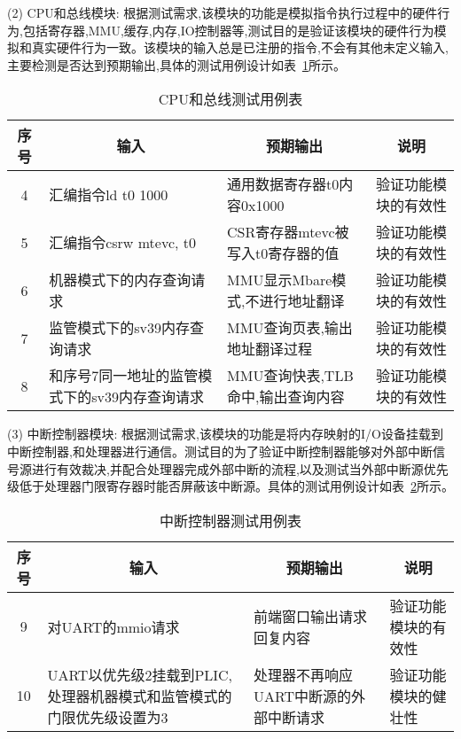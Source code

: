 (2) CPU和总线模块: 根据测试需求,该模块的功能是模拟指令执行过程中的硬件行为,包括寄存器,MMU,缓存,内存,IO控制器等,测试目的是验证该模块的硬件行为模拟和真实硬件行为一致。该模块的输入总是已注册的指令,不会有其他未定义输入,主要检测是否达到预期输出,具体的测试用例设计如表~\ref{tab:test2}所示。
\begin{table}[h]
    \centering
    \caption{CPU和总线测试用例表}
    \label{tab:test2}
    \renewcommand\arraystretch{1.2}
    \begin{tabular}{clll}
      \toprule
      \multicolumn{1}{c}{序号} & \multicolumn{1}{c}{输入} & \multicolumn{1}{c}{预期输出} &\multicolumn{1}{c}{说明}\\
      \midrule
  4	& \multicolumn{1}{m{3.5cm}}{汇编指令ld t0 1000} & \multicolumn{1}{m{3.5cm}}{通用数据寄存器t0内容0x1000} & \multicolumn{1}{m{3.5cm}}{验证功能模块的有效性}\\
  \hline
  5	& \multicolumn{1}{m{3.5cm}}{汇编指令csrw mtevc, t0} & \multicolumn{1}{m{3.5cm}}{CSR寄存器mtevc被写入t0寄存器的值} & \multicolumn{1}{m{3.5cm}}{验证功能模块的有效性}\\
  \hline
  6	& \multicolumn{1}{m{3.5cm}}{机器模式下的内存查询请求} & \multicolumn{1}{m{3.5cm}}{MMU显示Mbare模式,不进行地址翻译} & \multicolumn{1}{m{3.5cm}}{验证功能模块的有效性}\\
  \hline
  7	& \multicolumn{1}{m{3.5cm}}{监管模式下的sv39内存查询请求} & \multicolumn{1}{m{3.5cm}}{MMU查询页表,输出地址翻译过程} & \multicolumn{1}{m{3.5cm}}{验证功能模块的有效性}\\
  \hline
  8	& \multicolumn{1}{m{3.5cm}}{和序号7同一地址的监管模式下的sv39内存查询请求} & \multicolumn{1}{m{3.5cm}}{MMU查询快表,TLB命中,输出查询内容} & \multicolumn{1}{m{3.5cm}}{验证功能模块的有效性}\\
      \bottomrule
    \end{tabular}
\end{table}

(3) 中断控制器模块: 根据测试需求,该模块的功能是将内存映射的I/O设备挂载到中断控制器,和处理器进行通信。测试目的为了验证中断控制器能够对外部中断信号源进行有效裁决,并配合处理器完成外部中断的流程,以及测试当外部中断源优先级低于处理器门限寄存器时能否屏蔽该中断源。具体的测试用例设计如表~\ref{tab:test3}所示。
\begin{table}[h]
    \centering
    \caption{中断控制器测试用例表}
    \label{tab:test3}
    \renewcommand\arraystretch{1.2}
    \begin{tabular}{clll}
      \toprule
      \multicolumn{1}{c}{序号} & \multicolumn{1}{c}{输入} & \multicolumn{1}{c}{预期输出} &\multicolumn{1}{c}{说明}\\
      \midrule
  9	& \multicolumn{1}{m{3.5cm}}{对UART的mmio请求} & \multicolumn{1}{m{3.5cm}}{前端窗口输出请求回复内容} & \multicolumn{1}{m{3.5cm}}{验证功能模块的有效性}\\
  \hline
  10	& \multicolumn{1}{m{3.5cm}}{UART以优先级2挂载到PLIC,处理器机器模式和监管模式的门限优先级设置为3} & \multicolumn{1}{m{3.5cm}}{处理器不再响应UART中断源的外部中断请求} & \multicolumn{1}{m{3.5cm}}{验证功能模块的健壮性}\\
  \bottomrule
    \end{tabular}
\end{table}


